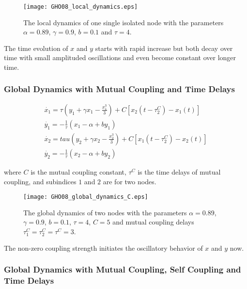 \begin{figure}[h!]
	\centering
	\texttt{[image: GHO08\_local\_dynamics.eps]}
		\caption{The local dynamics of one single isolated node with the parameters $\alpha = 0.89$, $\gamma=0.9$, $b=0.1$ and $\tau = 4$.}
\end{figure}

The time evolution of $x$ and $y$ starts with rapid increase but both decay over time with small amplituded oscillations and even become constant over longer time. 

\subsubsection{Global Dynamics with Mutual Coupling and Time Delays}

\begin{subequations}
 \begin{align}\dot{x_1} = \tau (y_1 + \gamma x_1 - \frac{x_1^3}{3}) + C [x_2(t-\tau_2^C)-x_1(t)] \label{eqn: frobenius 19}\\  \dot{y_1} = -\frac{1}{\tau} (x_1 - \alpha + b y_1) \label{eqn: frobenius 20} \\ \dot{x_2}=tau (y_2 + \gamma x_2 - \frac{x_2^3}{3}) + C [x_1(t-\tau_2^C)-x_2(t)] \label{eqn: frobenius 21} \\  \dot{y_2} = -\frac{1}{\tau} (x_2 - \alpha + by_2) \label{eqn: frobenius 22}\end{align} 
\end{subequations}

where $C$ is the mutual coupling constant, $\tau^C$ is the time delays of mutual coupling, and subindices $1$ and $2$ are for two nodes. 

\newpage

\begin{figure}[h!]
	\centering
	\texttt{[image: GHO08\_global\_dynamics\_C.eps]}
		\caption{The global dynamics of two nodes with the parameters $\alpha = 0.89$, $\gamma=0.9$, $b=0.1$, $\tau = 4$, $C=5$ and mutual coupling delays $\tau_1^C=\tau_2^C=\tau^C=3$.}
\end{figure}

The non-zero coupling strength initiates the oscillatory behavior of $x$ and $y$ now. 

\subsubsection{Global Dynamics with Mutual Coupling, Self Coupling and Time Delays}

